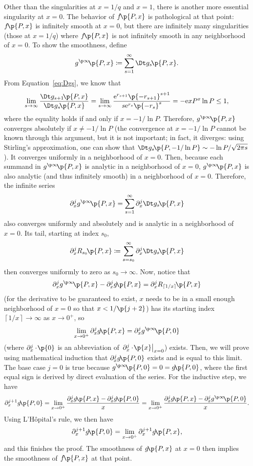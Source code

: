 \documentclass[oneside,12pt,final]{ucthesis-CA2012}
\newcommand{\mrm}[1]{\mathrm{#1}}
\newcommand{\ceq}{\coloneqq}
\newcommand{\e}{\mrm{e}}
\newcommand{\fr}{\frac}
\newcommand{\fc}[2]{#1\mathchoice{\!}{\!}{}{}\p{#2}} %
\newcommand{\abar}[2]{\left.#1\right|_{#2}} %
\newcommand\ceil[1]{\left\lceil#1\right\rceil}
\begin{document}
\begin{mainmatter}
Other than the singularities at $x=1/q$ and $x=1$, there is another more essential singularity
at $x=0$.
The behavior of $\fc f{P,x}$ is pathological at that point:
$\fc f{P,x}$ is infinitely smooth at $x=0$,
but there are infinitely many singularities (those at $x=1/q$)
where $\fc f{P,x}$ is not infinitely smooth in any neighborhood of $x=0$.
To show the smoothness, define
\[\fc{g^{\p\infty}}{P,x}\ceq\sum_{s=1}^\infty\fc{\Dt g_s}{P,x}.\]
From Equation~\ref{eq:Dgs}, we know that
\[\lim_{s\to\infty}\fr{\fc{\Dt g_{s+1}}{P,x}}{\fc{\Dt g_s}{P,x}}
=\lim_{s\to\infty}\fr{\e^{r_{s+1}}\p{-r_{s+1}}^{s+1}}{s\e^{r_s}\p{-r_s}^s}
=-\e xP^x\ln P\le1,\]
where the equality holds if and only if $x=-1/\ln P$.
Therefore, $\fc{g^{\p\infty}}{P,x}$ converges absolutely
if $x\ne-1/\ln P$
(the convergence at $x=-1/\ln P$ cannot be known through this argument,
but it is not important;
in fact, it diverges: using Stirling's approximation,
one can show that $\fc{\Dt g_s}{P,-1/\ln P}\sim-\ln P/\sqrt{2\pi s}$).
It converges uniformly in a neighborhood of $x=0$.
Then, because each summand in $\fc{g^{\p\infty}}{P,x}$ is analytic
in a neighborhood of $x=0$,
$\fc{g^{\p\infty}}{P,x}$ is also analytic (and thus infinitely smooth) in a neighborhood of $x=0$.
Therefore, the infinite series
\[\partial_x^j\fc{g^{\p\infty}}{P,x}=\sum_{s=1}^\infty\partial_x^j\fc{\Dt g_s}{P,x}\]
also converges uniformly and absolutely and is analytic in a neighborhood of $x=0$.
Its tail, starting at index $s_0$,
\[\partial_x^j\fc{R_{s_0}}{P,x}\ceq\sum_{s=s_0}^\infty\partial_x^j\fc{\Dt g_s}{P,x}\]
then converges uniformly to zero as $s_0\to\infty$.
Now, notice that
\[\partial_x^j\fc{g^{\p\infty}}{P,x}-\partial_x^j\fc g{P,x}=\partial_x^j\fc{R_{\ceil{1/x}}}{P,x}\]
(for the derivative to be guaranteed to exist, $x$ needs to be in a small enough neighborhood of $x=0$
so that $x<1/\p{j+2}$)
has its starting index $\ceil{1/x}\to\infty$ as $x\to0^+$, so
\[\lim_{x\to0^+}\partial_x^j\fc g{P,x}=\partial_x^j\fc{g^{\p\infty}}{P,0}\]
(where $\partial_x^j\fc\cdot0$ is an abbreviation of $\abar{\partial_x^j\fc\cdot x}{x=0}$)
exists.
Then, we will prove using mathematical induction that
$\partial_x^j\fc g{P,0}$ exists and is equal to this limit.
The base case $j=0$ is true because $\fc{g^{\p\infty}}{P,0}=0=\fc g{P,0}$,
where the first equal sign is derived by direct evaluation of the series.
For the inductive step, we have
\[\partial_x^{j+1}\fc g{P,0}
=\lim_{x\to0^+}\fr{\partial_x^j\fc g{P,x}-\partial_x^j\fc g{P,0}}x
=\lim_{x\to0^+}\fr{\partial_x^j\fc g{P,x}-\partial_x^j\fc{g^{\p\infty}}{P,0}}x.\]
Using L'H\^opital's rule, we then have
\[\partial_x^{j+1}\fc g{P,0}=\lim_{x\to0^+}\partial_x^{j+1}\fc g{P,x},\]
and this finishes the proof.
The smoothness of $\fc g{P,x}$ at $x=0$ then implies the smoothness of $\fc f{P,x}$ at that point.


\end{mainmatter}
\end{document}
